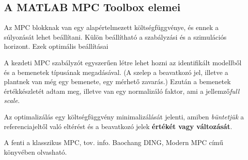 



\subsection{A MATLAB MPC Toolbox elemei}
Az MPC blokknak van egy alapértelmezett költségfüggvénye, és ennek a súlyozását lehet beállítani.
Külön beállítható a szabályzási és a szimulációs horizont.
Ezek optimális beállításai 

A kezdeti MPC szabályzót egyszerűen létre lehet hozni az identifikált modellből és a bemenetek típusának megadásával. (A szelep a beavatkozó jel, illetve a plantnek van még egy bemenete, egy mérhető zavarás.) Ezután a bemenetek értékkészletét adtam meg, illetve van egy normalizáló faktor, ami a jellemző\textit{full scale}.

Az optimalizálás egy költségfüggvény minimalizálását jelenti, amiben \textit{büntetjük} a referenciajeltől való eltérést és a beavatkozó jelek \textbf{értékét vagy változását}.

A fenti a klasszikus MPC, tov. info. Baochang DING, Modern MPC című könyvében olvasható.


